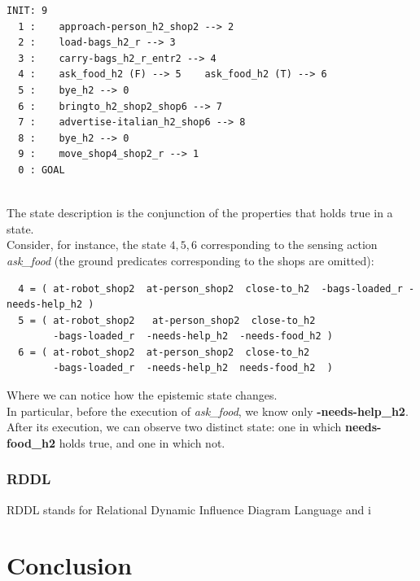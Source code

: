 \documentclass[pdftex,12pt,a4paper]{report}
\begin{document}
\begin{verbatim}
INIT: 9
  1 :    approach-person_h2_shop2 --> 2 
  2 :    load-bags_h2_r --> 3 
  3 :    carry-bags_h2_r_entr2 --> 4 
  4 :    ask_food_h2 (F) --> 5    ask_food_h2 (T) --> 6 
  5 :    bye_h2 --> 0 
  6 :    bringto_h2_shop2_shop6 --> 7 
  7 :    advertise-italian_h2_shop6 --> 8 
  8 :    bye_h2 --> 0 
  9 :    move_shop4_shop2_r --> 1 
  0 : GOAL
\end{verbatim}\\
\noindent The state description is the conjunction of the properties that holds true in a state.\\ 
Consider, for instance, the state $4,5,6$ corresponding to the sensing action \textit{ask\_food} (the ground predicates corresponding to the shops are omitted): 
\begin{verbatim}
  4 = ( at-robot_shop2  at-person_shop2  close-to_h2  -bags-loaded_r -needs-help_h2 )
  5 = ( at-robot_shop2   at-person_shop2  close-to_h2  
        -bags-loaded_r  -needs-help_h2  -needs-food_h2 )
  6 = ( at-robot_shop2  at-person_shop2  close-to_h2  
        -bags-loaded_r  -needs-help_h2  needs-food_h2  )
\end{verbatim}
Where we can notice how the epistemic state changes.\\ 
In particular, before the execution of  \textit{ask\_food}, we know only \textbf{-needs-help\_h2}. After its execution, we can observe two distinct state: one in which \textbf{needs-food\_h2} holds true, and one in which not.


\subsection{RDDL}
RDDL\cite{sanner2010relational} stands for Relational Dynamic Influence Diagram Language and i


\chapter{Conclusion}\label{sec:conclusion}
\end{document}
